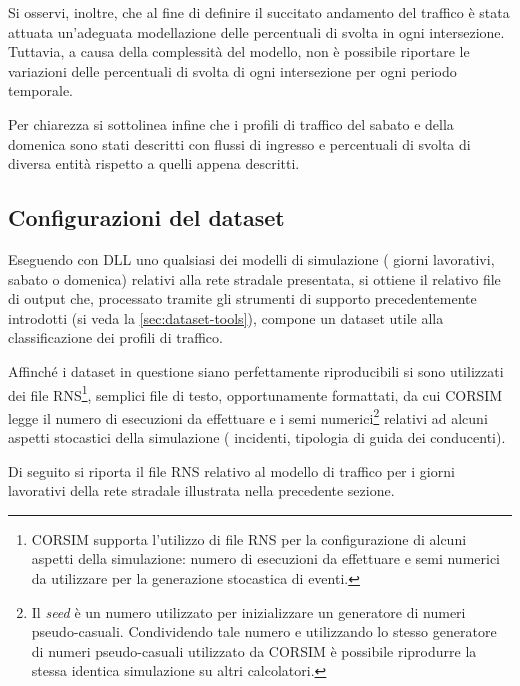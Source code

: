 Si osservi, inoltre, che al fine di definire il succitato andamento del traffico è stata attuata un'adeguata modellazione delle percentuali di svolta in ogni intersezione. Tuttavia, a causa della complessità del modello, non è possibile riportare le variazioni delle percentuali di svolta di ogni intersezione per ogni periodo temporale.

Per chiarezza si sottolinea infine che i profili di traffico del sabato e della domenica sono stati descritti con flussi di ingresso e percentuali di svolta di diversa entità rispetto a quelli appena descritti.

\subsection{Configurazioni del dataset}
Eseguendo con  \acs{DLL} uno qualsiasi dei modelli di simulazione (\ie{} giorni lavorativi, sabato o domenica) relativi alla rete stradale presentata, si ottiene il relativo file di output che, processato tramite gli strumenti di supporto precedentemente introdotti (si veda la \vref{sec:dataset-tools}), compone un dataset utile alla classificazione dei profili di traffico.

Affinché i dataset in questione siano perfettamente riproducibili si sono utilizzati dei file \acs{RNS}\footnote{\acs{CORSIM} supporta l'utilizzo di file \acf{RNS} per la configurazione di alcuni aspetti della simulazione: numero di esecuzioni da effettuare e semi numerici da utilizzare per la generazione stocastica di eventi.}, semplici file di testo, opportunamente formattati, da cui \acs{CORSIM} legge il numero di esecuzioni da effettuare e i semi numerici\footnote{Il \emph{seed} è un numero utilizzato per inizializzare un generatore di numeri pseudo-casuali. Condividendo tale numero e utilizzando lo stesso generatore di numeri pseudo-casuali utilizzato da \acs{CORSIM} è possibile riprodurre la stessa identica simulazione su altri calcolatori.} relativi ad alcuni aspetti stocastici della simulazione (\eg{} incidenti, tipologia di guida dei conducenti).

Di seguito si riporta il file \acs{RNS} relativo al modello di traffico per i giorni lavorativi della rete stradale illustrata nella precedente sezione.

